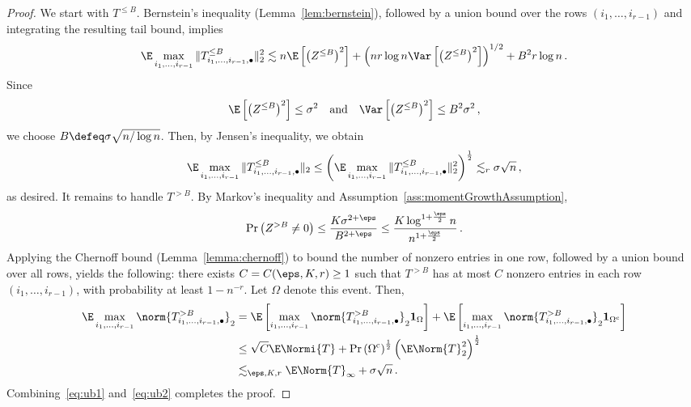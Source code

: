 \documentclass[11pt,a4paper]{article}
\begin{document}
\begin{proof}
    We start with $T^{\le B}$. Bernstein's inequality (Lemma~\ref{lem:bernstein}), followed by a union bound over the rows $(i_1, \ldots, i_{r-1})$ and integrating the resulting tail bound, implies
    \[
        \E \max_{i_1, \ldots, i_{r-1}} \|T^{\le B}_{i_1, \ldots, i_{r-1},\bullet}\|_2^2\lesssim n \E \left[\left(Z^{\le B}\right)^2\right] +  \left(nr \log n \Var \left[\left(Z^{\le B}\right)^2\right]\right)^{1/2} + B^2 r \log n\,.
    \]
    Since
    \[
        \E \left[\left(Z^{\le B}\right)^2\right]\le \sigma^2\quad \text{and} \quad\Var \left[\left(Z^{\le B}\right)^2\right]\le B^2 \sigma^2\,,
    \]
    we choose $B \defeq \sigma \sqrt{n/\log n}$. Then, by Jensen's inequality, we obtain 
    \begin{equation}
        \E \max_{i_1, \ldots, i_{r-1}} \|T^{\le B}_{i_1, \ldots, i_{r-1},\bullet}\|_2\le \left(\E \max_{i_1, \ldots, i_{r-1}} \|T^{\le B}_{i_1, \ldots, i_{r-1},\bullet}\|^2_2\right)^{\frac 12} \lesssim_r  \sigma \sqrt {n}\,, \label{eq:ub1}
    \end{equation}
    as desired. 
    It remains to handle $T^{>B}$. By
    Markov's inequality and Assumption~\ref{ass:momentGrowthAssumption},
    \[
        \Pr\left( Z^{>B}\neq 0\right) \le \frac {K \sigma^{2+\eps}} {B^{2+\eps}} \le \frac {K \log^{1+\frac \eps 2} n} {n^{1+\frac \eps 2}}\,.
    \]
    Applying the Chernoff bound (Lemma~\ref{lemma:chernoff}) to bound
    the number of nonzero entries in one
    row, followed by a union bound over all
    rows, yields the following: there exists $C=C(\eps,K,r)\ge 1$ such that
    $T^{>B}$ has at most $C$ nonzero entries in each
    row $(i_1, \ldots, i_{r-1})$, with probability at least $1-n^{-r}$. Let $\Omega$
    denote this event. Then,
    \begin{align}
        \E \max_{i_1, \ldots, i_{r-1}} \norm{T_{i_1, \ldots, i_{r-1},\bullet}^{>B}}_2 &= \E \left[\max_{i_1, \ldots, i_{r-1}} \norm{T_{i_1, \ldots, i_{r-1},\bullet}^{>B}}_2 \mathbf 1_{\Omega}\right] + \E \left[\max_{i_1, \ldots, i_{r-1}} \norm{T_{i_1, \ldots, i_{r-1},\bullet}^{>B}}_2 \mathbf 1_{\Omega^{\mathrm c}}\right]\nonumber\\
        &\le \sqrt C \E \Normi{T} + \Pr\left(\Omega^{\mathrm c}\right)^{\frac 12} \left(\E \Norm{T}_2^2\right)^{\frac 12}\nonumber\\
        &\lesssim_{\eps,K,r} \E \Norm{T}_\infty + \sigma \sqrt n\,.\label{eq:ub2}
    \end{align}
    Combining~\eqref{eq:ub1} and~\eqref{eq:ub2} completes the proof.
\end{proof}
\end{document}
